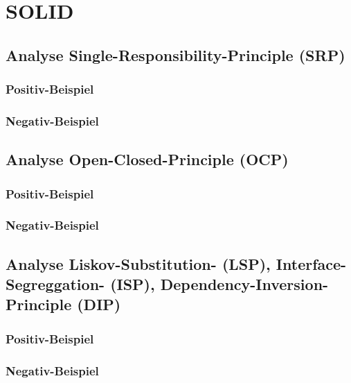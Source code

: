 \chapter{SOLID}

\section{Analyse Single-Responsibility-Principle (SRP)}

\subsection{Positiv-Beispiel}

\subsection{Negativ-Beispiel}

\section{Analyse Open-Closed-Principle (OCP)}

\subsection{Positiv-Beispiel}

\subsection{Negativ-Beispiel}

\section{Analyse Liskov-Substitution- (LSP), Interface-Segreggation- (ISP), Dependency-Inversion-Principle (DIP)}

\subsection{Positiv-Beispiel}

\subsection{Negativ-Beispiel}